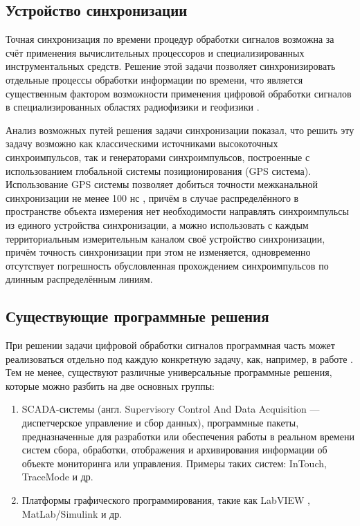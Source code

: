 \documentclass[a4paper, 14pt]{extarticle}
\begin{document}
  \subsection{Устройство синхронизации}\label{ssec:sync}

  Точная синхронизация по времени процедур обработки
  сигналов возможна за счёт применения вычислительных процессоров и специализированных
  инструментальных средств. Решение этой задачи позволяет синхронизировать отдельные процессы
  обработки информации по времени, что является существенным фактором возможности применения
  цифровой обработки сигналов в специализированных областях радиофизики и геофизики \cite{rathore-digital}.

  Анализ возможных путей решения задачи синхронизации показал, что решить эту задачу возможно как
  классическими источниками высокоточных синхроимпульсов, так и генераторами синхроимпульсов,
  построенные с использованием глобальной системы позиционирования (GPS система). Использование GPS
  системы позволяет добиться точности межканальной синхронизации не менее 100 нс \cite{lombardi-gps}, причём в случае
  распределённого в пространстве объекта измерения нет необходимости направлять синхроимпульсы из
  единого устройства синхронизации, а можно использовать с каждым территориальным измерительным
  каналом своё устройство синхронизации, причём точность синхронизации при этом не изменяется,
  одновременно отсутствует погрешность обусловленная прохождением синхроимпульсов по длинным
  распределённым линиям.

  \subsection{Существующие программные решения}\label{ssec:existing}

  При решении задачи цифровой обработки сигналов программная часть может реализоваться отдельно под
  каждую конкретную задачу, как, например, в работе \cite{bak-autometry}.
  Тем не менее, существуют различные универсальные программные решения, которые можно разбить на две
  основных группы:
  \begin{enumerate}
    \item SCADA-системы (англ. Supervisory Control And Data Acquisition — диспетчерское управление и
      сбор данных), программные пакеты, предназначенные для разработки или обеспечения работы в
      реальном времени систем сбора, обработки, отображения и архивирования информации об объекте
      мониторинга или управления. \cite{boyer-scada}
      Примеры таких систем: InTouch, TraceMode и др.
    \item Платформы графического программирования, такие как LabVIEW \cite{lavrov-labview}, MatLab/Simulink и др.
  \end{enumerate}
\end{document}
